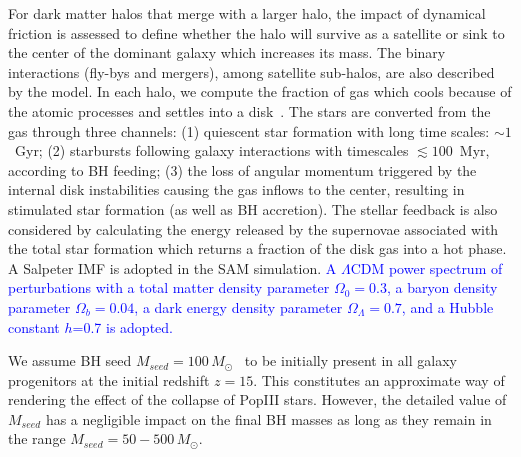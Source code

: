 \documentclass[twocolumn]{aastex631}
\newcommand{\ding}[1]{\textcolor{red}{[{\bf Xuheng}: #1]}}
\newcommand{\blue}[1]{\textcolor{blue}{#1}}
\begin{document}
For dark matter halos that merge with a larger halo, the impact of dynamical friction is assessed to define whether the halo will survive as a satellite or sink to the center of the dominant galaxy which increases its mass. The binary interactions (fly-bys and mergers), among satellite sub-halos, are  also described by the model. In each halo, we compute the fraction of gas which cools because of the atomic processes and settles into a disk~\citep{Mo1998}. The stars are converted from the gas through three channels: (1) quiescent star formation with long time scales: $\sim1$~Gyr; (2) starbursts following galaxy interactions with timescales $\lesssim 100$~Myr, 
according to BH feeding; (3) the loss of angular momentum triggered by the internal disk instabilities causing the gas inflows to the center, resulting in stimulated star formation (as well as BH accretion). The stellar feedback is also considered by calculating the energy released by the supernovae associated with the total star formation which returns a fraction of the disk gas into a hot phase. A Salpeter IMF is adopted in the SAM simulation. \blue{A $\Lambda$CDM power spectrum of perturbations with a total matter density parameter $\Omega_0=0.3$, a baryon density parameter 
$\Omega_b=0.04$, a dark energy density parameter $\Omega_\Lambda=0.7$, and a Hubble constant $h$=0.7 is adopted. }

{We assume BH seed $M_{seed}=100\,M_{\odot}$~\citep{Madau2001}  to be initially present in all galaxy progenitors at the initial redshift $z=15$. This constitutes an approximate way of rendering the effect of the collapse of PopIII stars. However, the detailed value of $M_{seed}$ has a negligible impact on the final BH masses as long as they remain in the range $M_{seed}=50-500\,M_{\odot}$.
}
\end{document}
